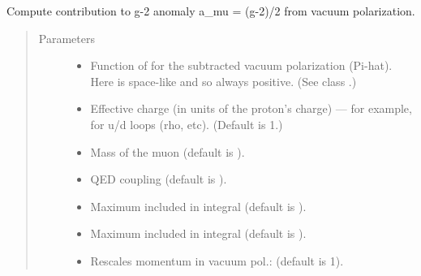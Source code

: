 \documentclass[letterpaper,10pt,english]{sphinxmanual}
\begin{document}
\begin{fulllineitems}
\label{\detokenize{g2tools:g2tools.a_mu}}
Compute contribution to g-2 anomaly a\_mu = (g-2)/2 from vacuum polarization.
\begin{quote}\begin{description}
\item[{Parameters}] \leavevmode\begin{itemize}
\item {} 
 \textendash{} Function of  for the subtracted vacuum polarization (Pi-hat).
Here  is space-like and so always positive.
(See class {\hyperref[\detokenize{g2tools:g2tools.vacpol}]{}}.)

\item {} 
 \textendash{} Effective charge (in units of the proton’s charge) — for
example,  for u/d loops (rho, etc). (Default is 1.)

\item {} 
 \textendash{} Mass of the muon (default is ).

\item {} 
 \textendash{} QED coupling (default is ).

\item {} 
 \textendash{} Maximum  included in integral (default is ).

\item {} 
 \textendash{} Maximum  included in integral (default is ).

\item {} 
 \textendash{} Rescales momentum in vacuum pol.: 
(default is 1).


\end{itemize}
\end{description}
\end{quote}
\end{fulllineitems}
\end{document}
